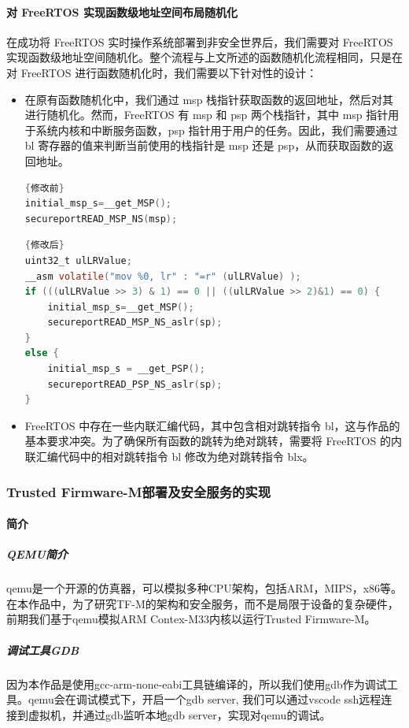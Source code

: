 \documentclass[UTF8,12pt,a4paper]{ctexart}
\numberwithin{figure}{section}
\begin{document}
\paragraph{对 FreeRTOS 实现函数级地址空间布局随机化}
\par 在成功将 FreeRTOS 实时操作系统部署到非安全世界后，我们需要对 FreeRTOS 实现函数级地址空间随机化。整个流程与上文所述的函数随机化流程相同，只是在对 FreeRTOS 进行函数随机化时，我们需要以下针对性的设计：
\begin{itemize}
    \item 在原有函数随机化中，我们通过 msp 栈指针获取函数的返回地址，然后对其进行随机化。然而，FreeRTOS 有 msp 和 psp 两个栈指针，其中 msp 指针用于系统内核和中断服务函数，psp 指针用于用户的任务。因此，我们需要通过 bl 寄存器的值来判断当前使用的栈指针是 msp 还是 psp，从而获取函数的返回地址。
          \begin{lstlisting}[language=C]{修改前}
initial_msp_s=__get_MSP();
secureportREAD_MSP_NS(msp); \end{lstlisting}
          \begin{lstlisting}[language=C]{修改后}
uint32_t ulLRValue;
__asm volatile("mov %0, lr" : "=r" (ulLRValue) );
if (((ulLRValue >> 3) & 1) == 0 || ((ulLRValue >> 2)&1) == 0) {
    initial_msp_s=__get_MSP();
    secureportREAD_MSP_NS_aslr(sp);
}
else {
    initial_msp_s = __get_PSP();
    secureportREAD_PSP_NS_aslr(sp);
} \end{lstlisting}
    \item FreeRTOS 中存在一些内联汇编代码，其中包含相对跳转指令 bl，这与作品的基本要求冲突。为了确保所有函数的跳转为绝对跳转，需要将 FreeRTOS 的内联汇编代码中的相对跳转指令 bl 修改为绝对跳转指令 blx。
\end{itemize}

\subsubsection{Trusted Firmware-M部署及安全服务的实现}
\paragraph{简介}
\subparagraph{QEMU简介}
\par qemu是一个开源的仿真器，可以模拟多种CPU架构，包括ARM，MIPS，x86等。在本作品中，为了研究TF-M的架构和安全服务，而不是局限于设备的复杂硬件，前期我们基于qemu模拟ARM Contex-M33内核以运行Trusted Firmware-M。
\subparagraph{调试工具GDB}
因为本作品是使用gcc-arm-none-eabi工具链编译的，所以我们使用gdb作为调试工具。qemu会在调试模式下，开启一个gdb server, 我们可以通过vscode ssh远程连接到虚拟机，并通过gdb监听本地gdb server，实现对qemu的调试。
\end{document}
